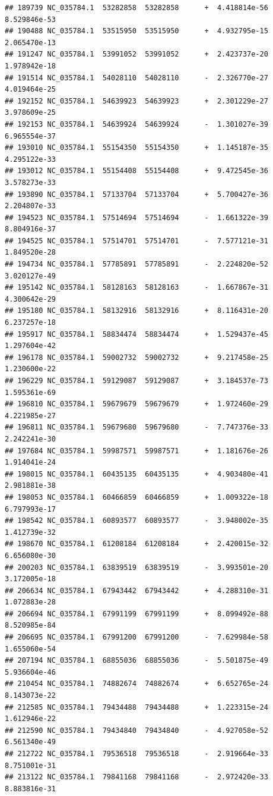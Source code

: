\documentclass[]{article}
\begin{document}
\begin{verbatim}
## 189739 NC_035784.1  53282858  53282858      +  4.418814e-56  8.529846e-53
## 190488 NC_035784.1  53515950  53515950      +  4.932795e-15  2.065470e-13
## 191247 NC_035784.1  53991052  53991052      +  2.423737e-20  1.978942e-18
## 191514 NC_035784.1  54028110  54028110      -  2.326770e-27  4.019464e-25
## 192152 NC_035784.1  54639923  54639923      +  2.301229e-27  3.978609e-25
## 192153 NC_035784.1  54639924  54639924      -  1.301027e-39  6.965554e-37
## 193010 NC_035784.1  55154350  55154350      +  1.145187e-35  4.295122e-33
## 193012 NC_035784.1  55154408  55154408      +  9.472545e-36  3.578273e-33
## 193890 NC_035784.1  57133704  57133704      +  5.700427e-36  2.204807e-33
## 194523 NC_035784.1  57514694  57514694      -  1.661322e-39  8.804916e-37
## 194525 NC_035784.1  57514701  57514701      -  7.577121e-31  1.849520e-28
## 194734 NC_035784.1  57785891  57785891      -  2.224820e-52  3.020127e-49
## 195142 NC_035784.1  58128163  58128163      -  1.667867e-31  4.300642e-29
## 195180 NC_035784.1  58132916  58132916      +  8.116431e-20  6.237257e-18
## 195917 NC_035784.1  58834474  58834474      +  1.529437e-45  1.297604e-42
## 196178 NC_035784.1  59002732  59002732      +  9.217458e-25  1.230600e-22
## 196229 NC_035784.1  59129087  59129087      +  3.184537e-73  1.595361e-69
## 196810 NC_035784.1  59679679  59679679      +  1.972460e-29  4.221985e-27
## 196811 NC_035784.1  59679680  59679680      -  7.747376e-33  2.242241e-30
## 197684 NC_035784.1  59987571  59987571      +  1.181676e-26  1.914041e-24
## 198015 NC_035784.1  60435135  60435135      +  4.903480e-41  2.981881e-38
## 198053 NC_035784.1  60466859  60466859      +  1.009322e-18  6.797993e-17
## 198542 NC_035784.1  60893577  60893577      -  3.948002e-35  1.412739e-32
## 198670 NC_035784.1  61208184  61208184      +  2.420015e-32  6.656080e-30
## 200203 NC_035784.1  63839519  63839519      -  3.993501e-20  3.172005e-18
## 206634 NC_035784.1  67943442  67943442      +  4.288310e-31  1.072883e-28
## 206694 NC_035784.1  67991199  67991199      +  8.099492e-88  8.520985e-84
## 206695 NC_035784.1  67991200  67991200      -  7.629984e-58  1.655060e-54
## 207194 NC_035784.1  68855036  68855036      -  5.501875e-49  5.936604e-46
## 210454 NC_035784.1  74882674  74882674      +  6.652765e-24  8.143073e-22
## 212585 NC_035784.1  79434488  79434488      +  1.223315e-24  1.612946e-22
## 212590 NC_035784.1  79434840  79434840      -  4.927058e-52  6.561340e-49
## 212722 NC_035784.1  79536518  79536518      -  2.919664e-33  8.751001e-31
## 213122 NC_035784.1  79841168  79841168      -  2.972420e-33  8.883816e-31

\end{verbatim}
\end{document}
